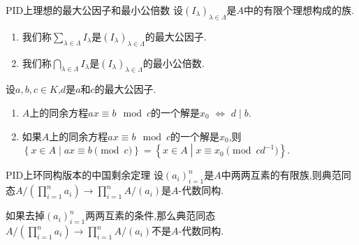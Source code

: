 \begin{definition}{PID上理想的最大公因子和最小公倍数}{}
	设$\left(I_{\lambda}\right)_{\lambda\in\Lambda}$是$A$中的有限个理想构成的族.
	\begin{enumerate}
		\item 我们称$\sum\limits_{\lambda\in\Lambda}I_{\lambda}$是$\left(I_{\lambda}\right)_{\lambda\in\Lambda}$的最大公因子.
		\item 我们称$\bigcap\limits_{\lambda\in\Lambda}I_{\lambda}$是$\left(I_{\lambda}\right)_{\lambda\in\Lambda}$的最小公倍数.
	\end{enumerate}
\end{definition}

\begin{proposition}{}{}
	设$a,b,c\in K$,$d$是$a$和$c$的最大公因子.
	\begin{enumerate}
		\item $A$上的同余方程$ax\equiv b\mod c$的一个解是$x_{0}$ $\iff$ $d\mid b$.
		\item 如果$A$上的同余方程$ax\equiv b\mod c$的一个解是$x_{0}$,则$\left\{x\in A\middle|ax\equiv b\pmod{c}\right\}=\left\{x\in A\middle|x\equiv x_{0}\pmod{cd^{-1}}\right\}$.
	\end{enumerate}
\end{proposition}

\begin{proposition}{PID上环同构版本的中国剩余定理}{}
	设$\left(a_{i}\right)_{i=1}^{n}$是$A$中两两互素的有限族,则典范同态$A/\left(\prod\limits_{i=1}^{n}a_{i}\right)\to\prod\limits_{i=1}^{n}A/\left(a_{i}\right)$是$A$-代数同构.
\end{proposition}

\begin{remark}{}{}
	如果去掉$\left(a_{i}\right)_{i=1}^{n}$两两互素的条件,那么典范同态$A/\left(\prod\limits_{i=1}^{n}a_{i}\right)\to\prod\limits_{i=1}^{n}A/\left(a_{i}\right)$不是$A$-代数同构.
\end{remark}